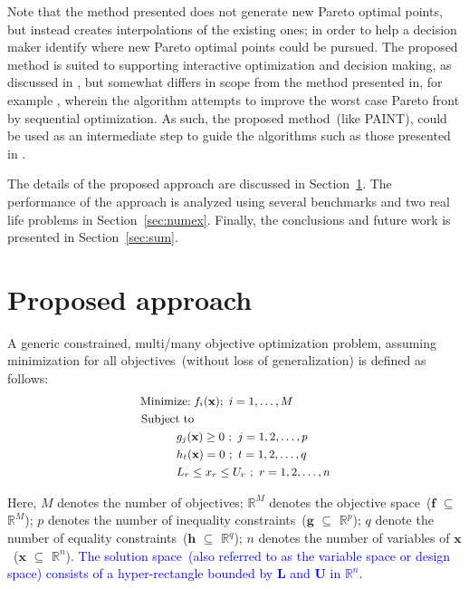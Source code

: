 {\color{blue}Note that the method presented does not generate new Pareto optimal points, but instead creates interpolations of the existing ones; in order to help a decision maker identify where new Pareto optimal points could be pursued. The proposed method is suited to supporting interactive optimization and decision making, as discussed in \cite{hartikainen2012paint}, but somewhat differs in scope from the method presented in, for example \cite{vzilinskas2015adaptation,vzilinskas2013worst}, wherein the algorithm attempts to improve the worst case Pareto front by sequential optimization. As such, the proposed method~(like PAINT), could be used as an intermediate step to guide the algorithms such as those presented in \cite{vzilinskas2015adaptation,vzilinskas2013worst}.} 

The details of the proposed approach are discussed in Section~\ref{sec:approach}. The performance of the approach is analyzed using several benchmarks and two real life problems in Section~\ref{sec:numex}. Finally, the conclusions and future work is presented in Section~\ref{sec:sum}.

\section{Proposed approach}
\label{sec:approach}

A generic constrained, multi/many objective optimization problem, assuming minimization for all objectives~(without loss of generalization) is defined as follows:
\begin{equation}\small
\begin{aligned}
\operatorname{Minimize:} \; & f_i(\textbf{x});~i=1,\dots,M\\
\text{Subject to} &\\
& \hspace{-1.5em}g_j(\textbf{x}) \geq 0~;~j=1,2,\dots,p\\
& \hspace{-1.5em}h_t(\textbf{x}) = 0~;~t=1,2,\dots,q\\
& \hspace{-1.5em}{L_r} \le x_r \le {U_r}~;~r=1,2,\dots,n \\
\label{eqn:MaOP}
\end{aligned}
\end{equation}

\noindent Here, $M$ denotes the number of objectives; $\mathbb{R}^M$ denotes the objective space~($\textbf{f}$ $\subseteq$ $\mathbb{R}^M$); $p$ denotes the number of inequality constraints~($\textbf{g}$ $\subseteq$ $\mathbb{R}^p$); $q$ denote the number of equality constraints~($\textbf{h}$ $\subseteq$ $\mathbb{R}^q$); $n$ denotes the number of variables of $\textbf{x}$~($\textbf{x}$ $\subseteq$ $\mathbb{R}^n$). \textcolor{blue}{The solution space~(also referred to as the variable space or design space) consists of a hyper-rectangle bounded by $\textbf{L}$ and $\textbf{U}$ in $\mathbb{R}^n$}. 

